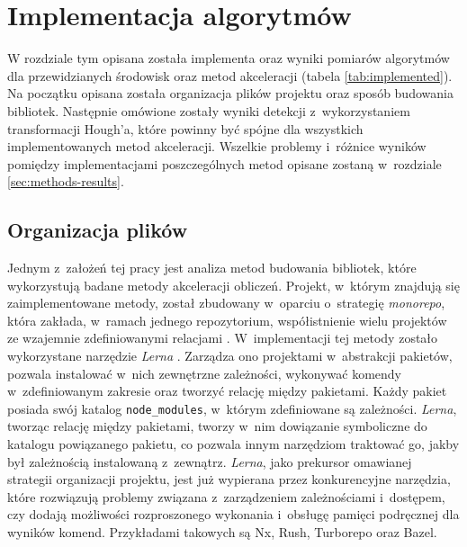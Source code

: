 \chapter{Implementacja algorytmów}
\label{sec:implementation}

W rozdziale tym opisana została implementa oraz wyniki pomiarów algorytmów dla przewidzianych środowisk oraz metod akceleracji (tabela \ref{tab:implemented}). Na początku opisana została organizacja plików projektu oraz sposób budowania bibliotek. Następnie omówione zostały wyniki detekcji z~wykorzystaniem transformacji Hough'a, które powinny być spójne dla wszystkich implementowanych metod akceleracji. Wszelkie problemy i~różnice wyników pomiędzy implementacjami poszczególnych metod opisane zostaną w~rozdziale \ref{sec:methods-results}. 



\section{Organizacja plików}

Jednym z~założeń tej pracy jest analiza metod budowania bibliotek, które wykorzystują badane metody akceleracji obliczeń. Projekt, w~którym znajdują się zaimplementowane metody, został zbudowany w~oparciu o~strategię \textit{monorepo}, która zakłada, w~ramach jednego repozytorium, współistnienie wielu projektów ze wzajemnie zdefiniowanymi relacjami \cite{monorepo}. W~implementacji tej metody zostało wykorzystane narzędzie \textit{Lerna} \cite{lerna}. Zarządza ono projektami w~abstrakcji pakietów, pozwala instalować w~nich zewnętrzne zależności, wykonywać komendy w~zdefiniowanym zakresie oraz tworzyć relację między pakietami. Każdy pakiet posiada swój katalog \lstinline{node_modules}, w~którym zdefiniowane są zależności. \textit{Lerna}, tworząc relację między pakietami, tworzy w~nim dowiązanie symboliczne do katalogu powiązanego pakietu, co pozwala innym narzędziom traktować go, jakby był zależnością instalowaną z~zewnątrz. \textit{Lerna}, jako prekursor omawianej strategii organizacji projektu, jest już wypierana przez konkurencyjne narzędzia, które rozwiązują problemy związana z~zarządzeniem zależnościami i~dostępem, czy dodają możliwości rozproszonego wykonania i~obsługę pamięci podręcznej dla wyników komend. Przykładami takowych są Nx, Rush, Turborepo oraz Bazel.

